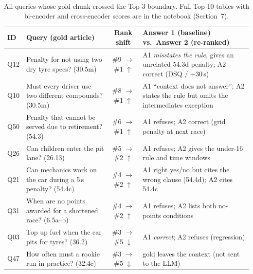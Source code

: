 \documentclass[11pt,a4paper]{article}
\newcommand{\up}{$\uparrow$}
\newcommand{\down}{$\downarrow$}
\begin{document}
\begin{table}[H]
\centering\small
\begin{tabularx}{\textwidth}{@{}l>{\raggedright\arraybackslash}p{5.6cm}cL@{}}
\toprule
ID & Query (gold article) & Rank shift & Answer 1 (baseline) vs.\ Answer 2 (re-ranked) \\
\midrule
Q12 & Penalty for not using two dry tyre specs? (30.5m) & \#9 $\to$ \#1 \up & A1 \emph{misstates the rule}, gives an unrelated 54.3d penalty; A2 correct (DSQ / +30\,s) \\
Q10 & Must every driver use two different compounds? (30.5m) & \#8 $\to$ \#1 \up & A1 ``context does not answer''; A2 states the rule but omits the intermediates exception \\
Q50 & Penalty that cannot be served due to retirement? (54.3) & \#6 $\to$ \#1 \up & A1 refuses; A2 correct (grid penalty at next race) \\
Q26 & Can children enter the pit lane? (26.13) & \#5 $\to$ \#2 \up & A1 refuses; A2 gives the under-16 rule and time windows \\
Q21 & Can mechanics work on the car during a 5\,s penalty? (54.4c) & \#4 $\to$ \#2 \up & A1 right yes/no but cites the wrong clause (54.4d); A2 cites 54.4c \\
Q31 & When are no points awarded for a shortened race? (6.5a--b) & \#4 $\to$ \#2 \up & A1 refuses; A2 lists both no-points conditions \\
\midrule
Q03 & Top up fuel when the car pits for tyres? (36.2) & \#3 $\to$ \#5 \down & A1 \emph{correct}; A2 refuses (regression) \\
Q47 & How often must a rookie run in practice? (32.4c) & \#3 $\to$ \#5 \down & gold leaves the context (not sent to the LLM) \\
\bottomrule
\end{tabularx}
\caption{All queries whose gold chunk crossed the Top-3 boundary. Full Top-10 tables with bi-encoder and
cross-encoder scores are in the notebook (Section~7).}
\label{tab:shifts}
\end{table}
\end{document}
